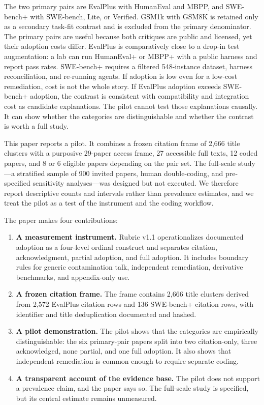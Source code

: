 \documentclass[11pt,a4paper]{article}
\begin{document}
The two primary pairs are EvalPlus with HumanEval and MBPP, and SWE-bench+ with SWE-bench, Lite, or Verified. GSM1k with GSM8K is retained only as a secondary task-fit contrast and is excluded from the primary denominator. The primary pairs are useful because both critiques are public and licensed, yet their adoption costs differ. EvalPlus is comparatively close to a drop-in test augmentation: a lab can run HumanEval+ or MBPP+ with a public harness and report pass rates. SWE-bench+ requires a filtered 548-instance dataset, harness reconciliation, and re-running agents. If adoption is low even for a low-cost remediation, cost is not the whole story. If EvalPlus adoption exceeds SWE-bench+ adoption, the contrast is consistent with compatibility and integration cost as candidate explanations. The pilot cannot test those explanations causally. It can show whether the categories are distinguishable and whether the contrast is worth a full study.

This paper reports a pilot. It combines a frozen citation frame of 2,666 title clusters with a purposive 29-paper access frame, 27 accessible full texts, 12 coded papers, and 8 or 6 eligible papers depending on the pair set. The full-scale study---a stratified sample of 900 invited papers, human double-coding, and pre-specified sensitivity analyses---was designed but not executed. We therefore report descriptive counts and intervals rather than prevalence estimates, and we treat the pilot as a test of the instrument and the coding workflow.

The paper makes four contributions:
\begin{enumerate}
  \item \textbf{A measurement instrument.} Rubric v1.1 operationalizes documented adoption as a four-level ordinal construct and separates citation, acknowledgment, partial adoption, and full adoption. It includes boundary rules for generic contamination talk, independent remediation, derivative benchmarks, and appendix-only use.
  \item \textbf{A frozen citation frame.} The frame contains 2,666 title clusters derived from 2,572 EvalPlus citation rows and 136 SWE-bench+ citation rows, with identifier and title deduplication documented and hashed.
  \item \textbf{A pilot demonstration.} The pilot shows that the categories are empirically distinguishable: the six primary-pair papers split into two citation-only, three acknowledged, none partial, and one full adoption. It also shows that independent remediation is common enough to require separate coding.
  \item \textbf{A transparent account of the evidence base.} The pilot does not support a prevalence claim, and the paper says so. The full-scale study is specified, but its central estimate remains unmeasured.
\end{enumerate}
\end{document}

